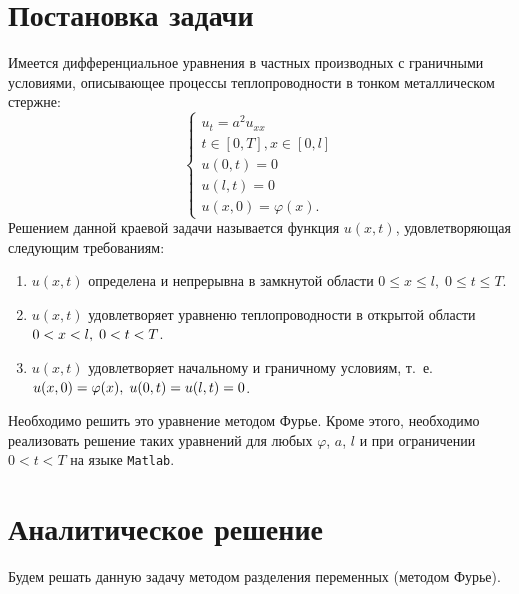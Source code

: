 \documentclass[11pt]{article}
\newcommand*{\hm}[1]{#1\nobreak\discretionary{}{\hbox{$\mathsurround=0pt #1$}}{}}
\begin{document}
\section{Постановка задачи}
Имеется дифференциальное уравнения в частных производных с граничными условиями, описывающее процессы теплопроводности в тонком металлическом стержне:
$$
\left\{
\begin{aligned}
u_t = a^2u_{xx} \\
t \in [0, T], x \in [0, l] \\
u(0, t) = 0 \\ u(l, t) = 0 \\
u(x, 0) = \varphi(x).
\end{aligned}
\right.
$$
Решением данной краевой задачи называется функция $u(x, t)$, удовлетворяющая следующим требованиям:
\begin{enumerate}
\item
$u(x, t)$ определена и непрерывна в замкнутой области $0 \leqslant x \leqslant l, \; 0 \leqslant t \leqslant T$.
\item
$u(x, t)$ удовлетворяет уравненю теплопроводности в открытой области $0 \hm< x \hm< l, \; 0 \hm< t \hm< T$.
\item
$u(x, t)$ удовлетворяет начальному и граничному условиям, т.~е. $u(x, 0) = \varphi(x), \; u(0, t) \hm= u(l, t) \hm= 0$.
\end{enumerate}
Необходимо решить это уравнение методом Фурье. Кроме этого, необходимо реализовать решение таких уравнений для любых $\varphi$,
$a$, $l$ и при ограничении $0 < t < T$ на языке \texttt{Matlab}.

\section{Аналитическое решение}
Будем решать данную задачу методом разделения переменных (методом Фурье).
\end{document}
